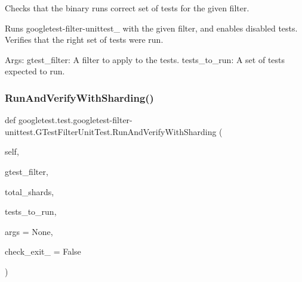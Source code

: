\begin{DoxyVerb}Checks that the binary runs correct set of tests for the given filter.

Runs googletest-filter-unittest_ with the given filter, and enables
disabled tests. Verifies that the right set of tests were run.

Args:
  gtest_filter: A filter to apply to the tests.
  tests_to_run: A set of tests expected to run.
\end{DoxyVerb}
 \mbox{\label{classgoogletest_1_1test_1_1googletest-filter-unittest_1_1_g_test_filter_unit_test_ac7d46fecfa3b0e865df66dc460805ff4}} 
\subsubsection{\texorpdfstring{RunAndVerifyWithSharding()}{RunAndVerifyWithSharding()}}
{\footnotesize\ttfamily def googletest.\+test.\+googletest-\/filter-\/unittest.\+G\+Test\+Filter\+Unit\+Test.\+Run\+And\+Verify\+With\+Sharding (\begin{DoxyParamCaption}\item[{}]{self,  }\item[{}]{gtest\+\_\+filter,  }\item[{}]{total\+\_\+shards,  }\item[{}]{tests\+\_\+to\+\_\+run,  }\item[{}]{args = {\ttfamily None},  }\item[{}]{check\+\_\+exit\+\_ = {\ttfamily False} }\end{DoxyParamCaption})}

